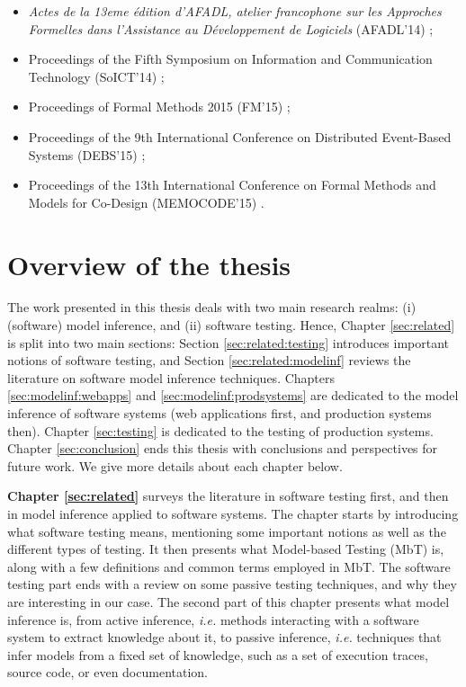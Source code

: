 \begin{itemize}
    \item \emph{Actes de la 13eme {\'e}dition d'AFADL, atelier
        francophone sur les Approches Formelles dans l'Assistance au
        D{\'e}veloppement de Logiciels} (AFADL'14)
        \cite{durand2014inference};

    \item Proceedings of the Fifth Symposium on Information and
        Communication Technology (SoICT'14)
        \cite{DBLP:conf/soict/DurandS14};

    \item Proceedings of Formal Methods 2015 (FM'15)
        \cite{DBLP:conf/fm/DurandS15};

    \item Proceedings of the 9th International Conference on
        Distributed Event-Based Systems (DEBS'15)
        \cite{DBLP:conf/debs/SalvaD15};

    \item Proceedings of the 13th International Conference on Formal
        Methods and Models for Co-Design (MEMOCODE'15)
        \cite{7340480}.
\end{itemize}


\section{Overview of the thesis}
\label{sec:intro:overview}

The work presented in this thesis deals with two main research
realms: (i) (software) model inference, and (ii) software
testing. Hence, Chapter \ref{sec:related} is split into two main
sections: Section \ref{sec:related:testing} introduces important
notions of software testing, and Section
\ref{sec:related:modelinf} reviews the literature on software
model inference techniques. Chapters \ref{sec:modelinf:webapps}
and \ref{sec:modelinf:prodsystems} are dedicated to the model
inference of software systems (web applications first, and
production systems then). Chapter \ref{sec:testing} is dedicated
to the testing of production systems. Chapter
\ref{sec:conclusion} ends this thesis with conclusions and
perspectives for future work. We give more details about each
chapter below.

\textbf{Chapter \ref{sec:related}} surveys the literature in
software testing first, and then in model inference applied to
software systems. The chapter starts by introducing what software
testing means, mentioning some important notions as well as the
different types of testing. It then presents what Model-based
Testing (MbT) is, along with a few definitions and common terms
employed in MbT. The software testing part ends with a review on
some passive testing techniques, and why they are interesting in
our case. The second part of this chapter presents what model
inference is, from active inference, \emph{i.e.} methods
interacting with a software system to extract knowledge about it,
to passive inference, \emph{i.e.} techniques that infer models
from a fixed set of knowledge, such as a set of execution traces,
source code, or even documentation.

